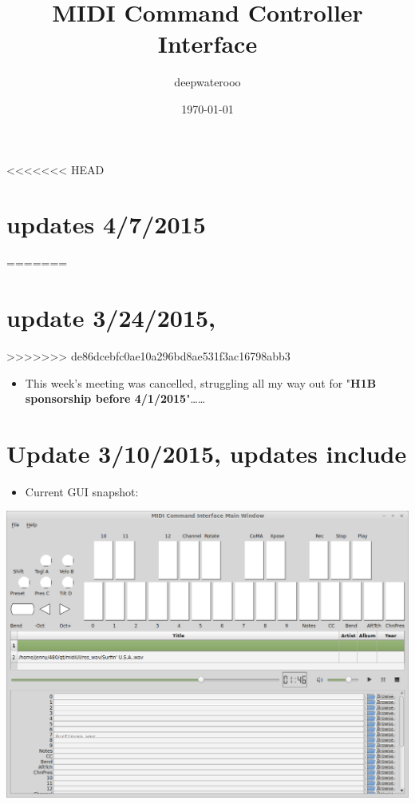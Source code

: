 \documentclass[9pt,b5paper]{article}
\author{deepwaterooo}
\date{\today}
\title{MIDI Command Controller Interface}
\begin{document}
\maketitle
\tableofcontents

<<<<<<< HEAD

\section{updates 4/7/2015}
=======
\section{update 3/24/2015,}
>>>>>>> de86dcebfc0ae10a296bd8ae531f3ac16798abb3
\label{sec-1}
\begin{itemize}
\item This week's meeting was cancelled, struggling all my way out for "\textbf{H1B sponsorship before 4/1/2015}"\ldots{}\ldots{}
\end{itemize}
\section{Update 3/10/2015, updates include}
\label{sec-2}
\begin{itemize}
\item Current GUI snapshot:
\end{itemize}

\includegraphics[width=.9\linewidth]{./pic/Screenshot_from_2015-03-08_13:31:00.png}
\end{document}
